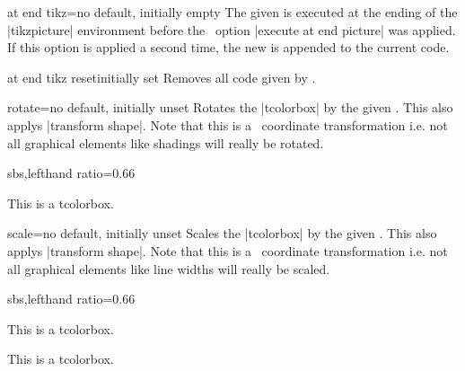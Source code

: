 \begin{docTcbKey}{at end tikz}{=}{no default, initially empty}
  The given  is executed at the ending of the |tikzpicture| environment
  before the \tikzname\  option |execute at end picture| was applied.
  If this option is applied a second time, the new  is appended to the current code.
\end{docTcbKey}


\begin{docTcbKey}{at end tikz reset}{}{initially set}
  Removes all code given by .
\end{docTcbKey}


\clearpage
\begin{docTcbKey}{rotate}{=}{no default, initially unset}
  Rotates the |tcolorbox| by the given .
  This also applys |transform shape|.
  Note that this is a \tikzname\  coordinate transformation i.e. not all graphical elements like shadings
  will really be rotated.
\begin{dispExample*}{sbs,lefthand ratio=0.66}

\begin{tcolorbox}[title=Rotated box,rotate=30]
This is a tcolorbox.
\end{tcolorbox}
\end{dispExample*}
\end{docTcbKey}

\begin{docTcbKey}{scale}{=}{no default, initially unset}
  Scales the |tcolorbox| by the given .
  This also applys |transform shape|.
  Note that this is a \tikzname\  coordinate transformation i.e. not all graphical elements like line widths
  will really be scaled.
\begin{dispExample*}{sbs,lefthand ratio=0.66}

\begin{tcolorbox}[title=Scaled box,scale=0.5]
This is a tcolorbox.
\end{tcolorbox}
\begin{tcolorbox}[title=Scaled box,scale=1.25]
This is a tcolorbox.
\end{tcolorbox}
\end{dispExample*}
\end{docTcbKey}


